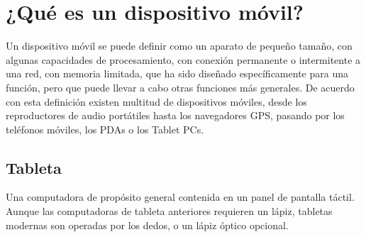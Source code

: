 \section{¿Qué es un dispositivo móvil?}

Un dispositivo móvil se puede definir como un aparato de pequeño tamaño, con algunas capacidades de procesamiento, con conexión permanente o intermitente a una red, con memoria limitada, que ha sido diseñado específicamente para una función, pero que puede llevar a cabo otras funciones más generales. De acuerdo con esta definición existen multitud de dispositivos móviles, desde los reproductores de audio portátiles hasta los navegadores GPS, pasando por los teléfonos móviles, los PDAs o los Tablet PCs. \cite{dispositivomovil}
\\\newline
\subsection{Tableta}

Una computadora de propósito general contenida en un panel de pantalla táctil. Aunque las computadoras de tableta anteriores requieren un lápiz, tabletas modernas son operadas por los dedos, o un lápiz óptico opcional. \cite{tablet}
\\\newline